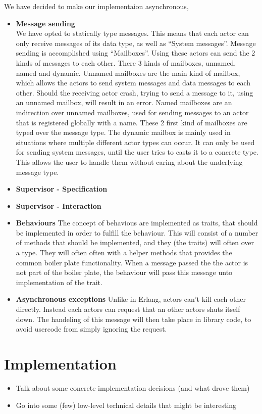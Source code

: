 \documentclass[a4paper]{article}
\begin{document}
We have decided to make our implementaion asynchronous,
\begin{itemize}
\item \textbf{Message sending}\\
  We have opted to statically type messages. This means that each actor can only
  receive messages of its data type, as well as ``System messages''. Message
  sending is accomplished using ``Mailboxes''. Using these actors can
  send the 2 kinds of messages to each other. There 3 kinds of mailboxes,
  unnamed, named and dynamic. Unnamed mailboxes are the main kind of mailbox,
  which allows the actors to send system messages and data messages to each
  other. Should the receiving actor crash, trying to send a message to it, using
  an unnamed mailbox, will result in an error. Named mailboxes are an
  indirection over unnamed mailboxes, used for sending messages to an actor that
  is registered globally with a name. These 2 first kind of mailboxes are typed
  over the message type. The dynamic mailbox is mainly used in situations where
  multiple different actor types can occur. %
  It can only be used for sending system messages, until the user tries to casts
  it to a concrete type. This allows the user to handle them without caring
  about the underlying message type.
\item \textbf{Supervisor - Specification}

\item \textbf{Supervisor - Interaction}
\item \textbf{Behaviours}
  The concept of behavious are implemented as traits, that should be implemented
  in order to fulfill the behaviour. This will consist of a number of methods
  that should be implemented, and they (the traits) will often over a type. They
  will often often with a helper methods that provides the common boiler plate
  functionality. When a message passed the the actor is not part of the boiler
  plate, the behaviour will pass this message unto implementation of the trait.
\item \textbf{Asynchronous exceptions} %
  Unlike in Erlang, actors can't kill each other directly. Instead each
  actors can request that an other actors shuts itself down. The handeling of
  this message will then take place in library code, to avoid usercode from
  simply ignoring the request.
\end{itemize}

\section{Implementation}
\begin{itemize}
\item Talk about some concrete implementation decisions (and what drove them)
\item Go into some (few) low-level technical details that might be interesting
\end{itemize}
\end{document}

